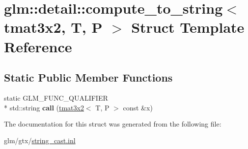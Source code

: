 \hypertarget{structglm_1_1detail_1_1compute__to__string_3_01tmat3x2_00_01T_00_01P_01_4}{\section{glm\-:\-:detail\-:\-:compute\-\_\-to\-\_\-string$<$ tmat3x2, T, P $>$ Struct Template Reference}
\label{structglm_1_1detail_1_1compute__to__string_3_01tmat3x2_00_01T_00_01P_01_4}
}
\subsection*{Static Public Member Functions}
\begin{DoxyCompactItemize}
\item 
\hypertarget{structglm_1_1detail_1_1compute__to__string_3_01tmat3x2_00_01T_00_01P_01_4_a08dc9495d864f76f2b163459d1d81de9}{static G\-L\-M\-\_\-\-F\-U\-N\-C\-\_\-\-Q\-U\-A\-L\-I\-F\-I\-E\-R \\*
std\-::string {\bfseries call} (\hyperlink{structglm_1_1tmat3x2}{tmat3x2}$<$ T, P $>$ const \&x)}\label{structglm_1_1detail_1_1compute__to__string_3_01tmat3x2_00_01T_00_01P_01_4_a08dc9495d864f76f2b163459d1d81de9}

\end{DoxyCompactItemize}


The documentation for this struct was generated from the following file\-:\begin{DoxyCompactItemize}
\item 
glm/gtx/\hyperlink{string__cast_8inl}{string\-\_\-cast.\-inl}\end{DoxyCompactItemize}
